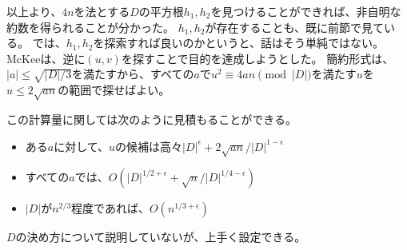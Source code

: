以上より、$4n$を法とする$D$の平方根$h_1,h_2$を見つけることができれば、非自明な約数を得られることが分かった。
$h_1,h_2$が存在することも、既に前節で見ている。
では、$h_1,h_2$を探索すれば良いのかというと、話はそう単純ではない。
McKeeは、逆に$(u,v)$を探すことで目的を達成しようとした。
簡約形式は、$|a|\le\sqrt{|D|/3}$を満たすから、すべての$a$で$u^2\equiv4an\pmod{|D|}$を満たす$u$を$u\le2\sqrt{an}$の範囲で探せばよい。

この計算量に関しては次のように見積もることができる。
\begin{itemize}
\item ある$a$に対して、$u$の候補は高々$|D|^{\epsilon}+2\sqrt{an}/|D|^{1-\epsilon}$
\item すべての$a$では、$O(|D|^{1/2+\epsilon} + \sqrt{n}/|D|^{1/4-\epsilon})$
\item $|D|$が$n^{2/3}$程度であれば、$O(n^{1/3+\epsilon})$
\end{itemize}

$D$の決め方について説明していないが、上手く設定できる。
